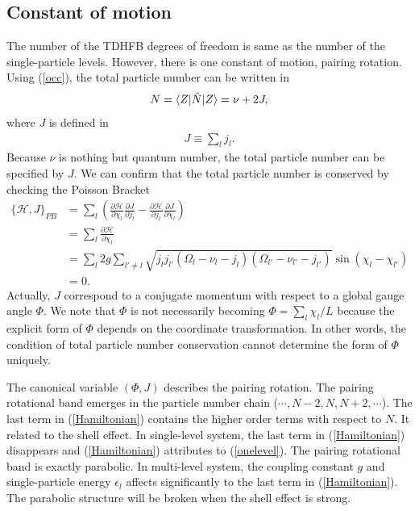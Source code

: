 \documentclass[11pt]{book} %
\begin{document}
\subsection{Constant of motion}
\label{constant}
The number of the TDHFB degrees of freedom is same as the number of the single-particle levels. However, there is one constant of motion, pairing rotation. Using (\ref{occ}), the total particle number can be written in
\begin{align}
	N = \braket{Z|\hat{N}|Z} = \nu + 2J ,
\end{align}
where $J$ is defined in
\begin{align}
	J \equiv \sum_l j_l .
\end{align}
Because $\nu$ is nothing but quantum number, the total particle number can be specified by $J$.
We can confirm that the total particle number is conserved by checking the Poisson Bracket
\begin{align}
	\{\mathcal{H},J\}_{PB} &= \sum_l \left(
	\frac{\partial\mathcal{H}}{\partial\chi_l}\frac{\partial J}{\partial j_l}
	- \frac{\partial\mathcal{H}}{\partial j_l}\frac{\partial J}{\partial \chi_l} \right) \nonumber \\
	&= \sum_l \frac{\partial\mathcal{H}}{\partial\chi_l} \nonumber \\
	&= \sum_l 2g \sum_{l'\neq l} \sqrt{j_{l}j_{l'}(\Omega_{l}-\nu_{l}-j_{l})(\Omega_{l'}-\nu_{l'}-j_{l'})}\sin{(\chi_{l}-\chi_{l'})} \nonumber \\
	&= 0 .
\end{align} 
Actually, $J$ correspond to a conjugate momentum with respect to a global gauge angle $\Phi$. We note that $\Phi$ is not necessarily becoming $\Phi=\sum_l \chi_l/L$ because the explicit form of $\Phi$ depends on the coordinate transformation. In other words, the condition of total particle number conservation cannot determine the form of $\Phi$ uniquely.

The canonical variable $(\Phi,J)$ describes the pairing rotation. The pairing rotational band emerges in the particle number chain ($\cdots,N-2,N,N+2,\cdots$). The last term in (\ref{Hamiltonian}) contains the higher order terms with respect to $N$. It related to the shell effect. In single-level system, the last term in (\ref{Hamiltonian}) disappears and (\ref{Hamiltonian}) attributes to (\ref{onelevel}). The pairing rotational band is exactly parabolic. In multi-level system, the coupling constant $g$ and single-particle energy $\epsilon_l$ affects significantly to the last term in (\ref{Hamiltonian}). The parabolic structure will be broken when the shell effect is strong. 
\end{document}
